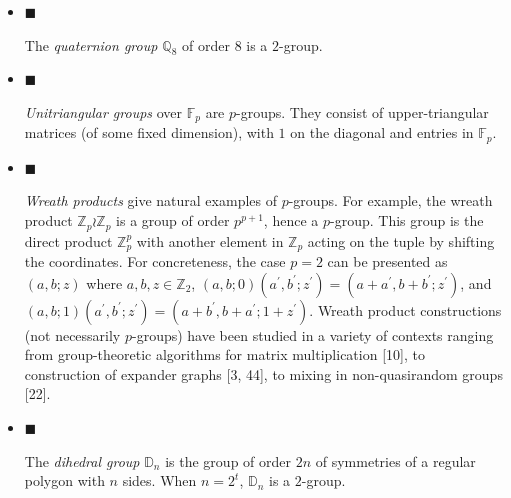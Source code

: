 \documentclass[10pt,a4paper]{article}
\begin{document}
\begin{itemize}


\item[] 
$\blacksquare$ 


The \emph{quaternion group $\mathbb{Q}_{8}$ }of order $8$ is a $2$-group.\par





\item[] 
$\blacksquare$ 


\emph{Unitriangular groups} over $\mathbb{F}_{p}$ are $p$-groups.
They consist of upper-triangular matrices (of some fixed dimension),
with $1$ on the diagonal and entries in $\mathbb{F}_{p}$.\par





\item[] 
$\blacksquare$ 


\emph{Wreath products} give natural examples of $p$-groups. For example,
the wreath product $\mathbb{Z}_{p}\wr\mathbb{Z}_{p}$ is a group of
order $p^{p+1}$, hence a $p$-group. This group is the direct product
$\mathbb{Z}_{p}^{p}$ with another element in $\mathbb{Z}_{p}$ acting
on the tuple by shifting the coordinates. For concreteness, the case
$p=2$ can be presented as $(a,b;z)$ where $a,b,z\in\mathbb{Z}_{2}$,
$(a,b;0)(a^{\prime},b^{\prime};z^{\prime})=(a+a^{\prime},b+b^{\prime};z^{\prime})$, and $(a,b;1)(a^{\prime},b^{\prime};z^{\prime})=(a+b^{\prime},b+a^{\prime};1+z^{\prime})$.
Wreath product constructions (not necessarily $p$-groups) have been
studied in a variety of contexts ranging from group-theoretic algorithms
for matrix multiplication [10], to construction of expander
graphs [3, 44], to mixing
in non-quasirandom groups [22].\par





\item[] 
$\blacksquare$ 


The \emph{dihedral group }$\mathbb{D}_{n}$ is the group of order $2n$ of symmetries
of a regular polygon with $n$ sides. When $n=2^{t}$, $\mathbb{D}_{n}$ is a $2$-group.\par





\end{itemize}
\end{document}
